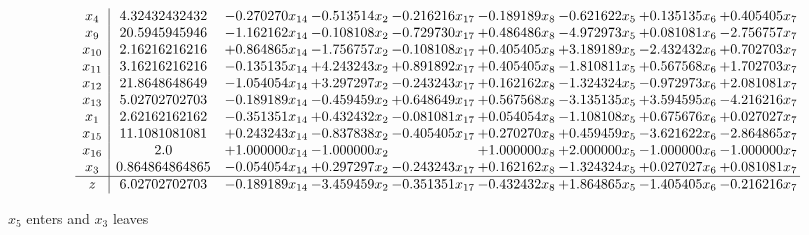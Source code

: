 \documentclass[10pt]{article}
\begin{document}
 \[\begin{array}{c| c c@{\hskip 2pt} c@{\hskip 2pt} c@{\hskip 2pt} c@{\hskip 2pt} c@{\hskip 2pt} c@{\hskip 2pt} c@{\hskip 2pt} }
 x_{4}   &  4.32432432432 & -0.270270 x_{14} & -0.513514 x_{2} & -0.216216 x_{17} & -0.189189 x_{8} & -0.621622 x_{5} & + 0.135135 x_{6} & + 0.405405 x_{7}\\
 x_{9}   &  20.5945945946 & -1.162162 x_{14} & -0.108108 x_{2} & -0.729730 x_{17} & + 0.486486 x_{8} & -4.972973 x_{5} & + 0.081081 x_{6} & -2.756757 x_{7}\\
 x_{10}   &  2.16216216216 & + 0.864865 x_{14} & -1.756757 x_{2} & -0.108108 x_{17} & + 0.405405 x_{8} & + 3.189189 x_{5} & -2.432432 x_{6} & + 0.702703 x_{7}\\
 x_{11}   &  3.16216216216 & -0.135135 x_{14} & + 4.243243 x_{2} & + 0.891892 x_{17} & + 0.405405 x_{8} & -1.810811 x_{5} & + 0.567568 x_{6} & + 1.702703 x_{7}\\
 x_{12}   &  21.8648648649 & -1.054054 x_{14} & + 3.297297 x_{2} & -0.243243 x_{17} & + 0.162162 x_{8} & -1.324324 x_{5} & -0.972973 x_{6} & + 2.081081 x_{7}\\
 x_{13}   &  5.02702702703 & -0.189189 x_{14} & -0.459459 x_{2} & + 0.648649 x_{17} & + 0.567568 x_{8} & -3.135135 x_{5} & + 3.594595 x_{6} & -4.216216 x_{7}\\
 x_{1}   &  2.62162162162 & -0.351351 x_{14} & + 0.432432 x_{2} & -0.081081 x_{17} & + 0.054054 x_{8} & -1.108108 x_{5} & + 0.675676 x_{6} & + 0.027027 x_{7}\\
 x_{15}   &  11.1081081081 & + 0.243243 x_{14} & -0.837838 x_{2} & -0.405405 x_{17} & + 0.270270 x_{8} & + 0.459459 x_{5} & -3.621622 x_{6} & -2.864865 x_{7}\\
 x_{16}   &  2.0 & + 1.000000 x_{14} & -1.000000 x_{2} &   & + 1.000000 x_{8} & + 2.000000 x_{5} & -1.000000 x_{6} & -1.000000 x_{7}\\
 x_{3}   &  0.864864864865 & -0.054054 x_{14} & + 0.297297 x_{2} & -0.243243 x_{17} & + 0.162162 x_{8} & -1.324324 x_{5} & + 0.027027 x_{6} & + 0.081081 x_{7}\\
\hline
z    &  6.02702702703 & -0.189189 x_{14} & -3.459459 x_{2} & -0.351351 x_{17} & -0.432432 x_{8} & + 1.864865 x_{5} & -1.405405 x_{6} & -0.216216 x_{7}\\
\end{array}\]


 $ x_{5} $ enters and $ x_{3} $ leaves 
\end{document}
